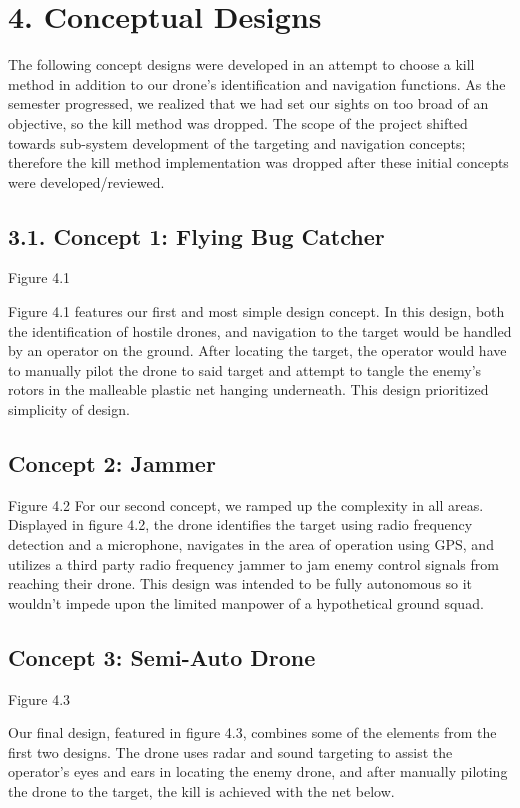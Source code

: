 \documentclass[10pt]{article}
\begin{document}
\section{4.  Conceptual Designs}
The following concept designs were developed in an attempt to choose a kill method in addition to our drone’s identification and navigation functions. As the semester progressed, we realized that we had set our sights on too broad of an objective, so the kill method was dropped. The scope of the project shifted towards sub-system development of the targeting and navigation concepts; therefore the kill method implementation was dropped after these initial concepts were developed/reviewed.

\subsection{3.1. Concept 1:  Flying Bug Catcher}

Figure 4.1

	Figure 4.1 features our first and most simple design concept. In this design, both the identification of hostile drones, and navigation to the target would be handled by an operator on the ground. After locating the target, the operator would have to manually pilot the drone to said target and attempt to tangle the enemy’s rotors in the malleable plastic net hanging underneath. This design prioritized simplicity of design.

\subsection{Concept 2:  Jammer}

Figure 4.2
For our second concept, we ramped up the complexity in all areas. Displayed in figure 4.2, the drone identifies the target using radio frequency detection and a microphone, navigates in the area of operation using GPS, and  utilizes a third party radio frequency jammer to jam enemy control signals from reaching their drone. This design was intended to be fully autonomous so it wouldn’t impede upon the limited manpower of a hypothetical ground squad.

\subsection{Concept 3:  Semi-Auto Drone}

Figure 4.3

	Our final design, featured in figure 4.3, combines some of the elements from the first two designs. The drone uses radar and sound targeting to assist the operator’s eyes and ears in locating the enemy drone, and after manually piloting the drone to the target, the kill is achieved with the net below. 
\end{document}
